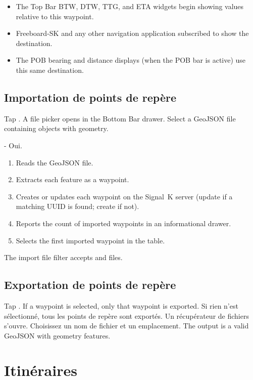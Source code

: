\begin{itemize}
  \item The Top Bar BTW, DTW, TTG, and ETA widgets begin showing values relative to this waypoint.
  \item Freeboard-SK and any other navigation application subscribed to  show the destination.
  \item The POB bearing and distance displays (when the POB bar is active) use this same destination.
\end{itemize}

\section{Importation de points de repère}

Tap . A file picker opens in the Bottom Bar drawer.
Select a GeoJSON file containing  objects with  geometry.

- Oui.
\begin{enumerate}
  \item Reads the GeoJSON file.
  \item Extracts each  feature as a waypoint.
  \item Creates or updates each waypoint on the Signal~K server (update if a matching UUID is found; create if not).
  \item Reports the count of imported waypoints in an informational drawer.
  \item Selects the first imported waypoint in the table.
\end{enumerate}

The import file filter accepts  and  files.

\section{Exportation de points de repère}

Tap . If a waypoint is selected, only that waypoint is exported.
Si rien n'est sélectionné, tous les points de repère sont exportés.
Un récupérateur de fichiers s'ouvre. Choisissez un nom de fichier et un emplacement.
The output is a valid GeoJSON  with  geometry features.

\chapter{Itinéraires}
\label{ch:routes}

